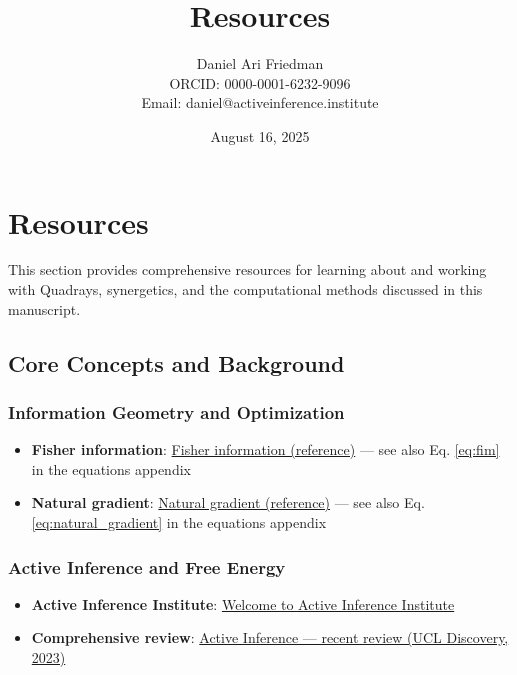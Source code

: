 \documentclass[
  10pt,
]{article}
\title{Resources}
\author{Daniel Ari Friedman\\ ORCID: 0000-0001-6232-9096\\ Email: daniel@activeinference.institute}
\date{August 16, 2025}
\providecommand{\tightlist}{%
  \setlength{\itemsep}{0pt}\setlength{\parskip}{0pt}}
\begin{document}
\maketitle

{
\hypersetup{linkcolor=black}
\setcounter{tocdepth}{3}
\tableofcontents
}
\hypertarget{resources}{%
\section{Resources}\label{resources}}

This section provides comprehensive resources for learning about and
working with Quadrays, synergetics, and the computational methods
discussed in this manuscript.

\hypertarget{core-concepts-and-background}{%
\subsection{Core Concepts and
Background}\label{core-concepts-and-background}}

\hypertarget{information-geometry-and-optimization}{%
\subsubsection{Information Geometry and
Optimization}\label{information-geometry-and-optimization}}

\begin{itemize}
\tightlist
\item
  \textbf{Fisher information}:
  \href{https://en.wikipedia.org/wiki/Fisher_information}{Fisher
  information (reference)} --- see also Eq. \eqref{eq:fim} in the
  equations appendix
\item
  \textbf{Natural gradient}:
  \href{https://en.wikipedia.org/wiki/Natural_gradient}{Natural gradient
  (reference)} --- see also Eq. \eqref{eq:natural_gradient} in the
  equations appendix
\end{itemize}

\hypertarget{active-inference-and-free-energy}{%
\subsubsection{Active Inference and Free
Energy}\label{active-inference-and-free-energy}}

\begin{itemize}
\tightlist
\item
  \textbf{Active Inference Institute}:
  \href{https://welcome.activeinference.institute/}{Welcome to Active
  Inference Institute}
\item
  \textbf{Comprehensive review}:
  \href{https://discovery.ucl.ac.uk/id/eprint/10176959/1/1-s2.0-S1571064523001094-main.pdf}{Active
  Inference --- recent review (UCL Discovery, 2023)}
\end{itemize}
\end{document}
